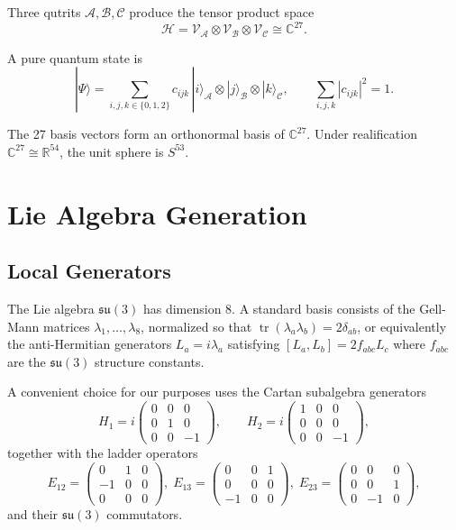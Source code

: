 \documentclass[12pt,a4paper]{article}
\begin{document}
Three qutrits $\mathcal{A}, \mathcal{B}, \mathcal{C}$ produce the tensor
product space
\[
\mathcal{H} = \mathcal{V}_{\mathcal{A}} \otimes \mathcal{V}_{\mathcal{B}}
\otimes \mathcal{V}_{\mathcal{C}} \cong \mathbb{C}^{27}.
\]

A pure quantum state is
\[
|\Psi\rangle = \sum_{i,j,k \in \{0,1,2\}} c_{ijk}\,
|i\rangle_{\mathcal{A}} \otimes |j\rangle_{\mathcal{B}} \otimes
|k\rangle_{\mathcal{C}},\qquad \sum_{i,j,k} |c_{ijk}|^2 = 1.
\]

The 27 basis vectors form an orthonormal basis of $\mathbb{C}^{27}$.
Under realification $\mathbb{C}^{27} \cong \mathbb{R}^{54}$, the unit
sphere is $S^{53}$.

\section{Lie Algebra Generation}

\subsection{Local Generators}

The Lie algebra $\mathfrak{su}(3)$ has dimension 8. A standard basis
consists of the Gell-Mann matrices $\lambda_1,\dots,\lambda_8$,
normalized so that $\operatorname{tr}(\lambda_a\lambda_b) = 2\delta_{ab}$,
or equivalently the anti-Hermitian generators $L_a = i\lambda_a$
satisfying $[L_a, L_b] = 2f_{abc} L_c$ where $f_{abc}$ are the
$\mathfrak{su}(3)$ structure constants.

A convenient choice for our purposes uses the Cartan subalgebra
generators
\[
H_1 = i\begin{pmatrix}0&0&0\\0&1&0\\0&0&-1\end{pmatrix},\qquad
H_2 = i\begin{pmatrix}1&0&0\\0&0&0\\0&0&-1\end{pmatrix},
\]
together with the ladder operators
\[
E_{12} = \begin{pmatrix}0&1&0\\-1&0&0\\0&0&0\end{pmatrix},\;
E_{13} = \begin{pmatrix}0&0&1\\0&0&0\\-1&0&0\end{pmatrix},\;
E_{23} = \begin{pmatrix}0&0&0\\0&0&1\\0&-1&0\end{pmatrix},
\]
and their $\mathfrak{su}(3)$ commutators.
\end{document}

